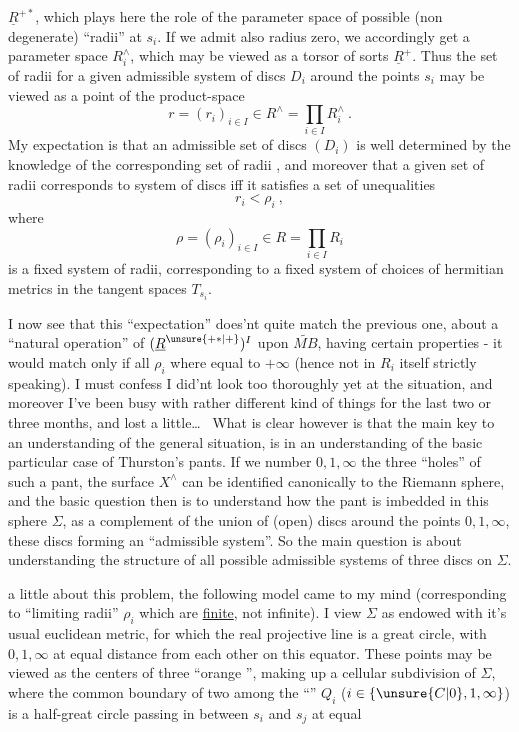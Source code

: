  $\underline R^{+*}$, which plays here the role of the parameter space of  possible (non degenerate) ``radii'' at $s_i$. If we admit also radius zero, we accordingly get a parameter space $R_i^{\wedge}$, which may be viewed as a torsor of sorts  $\underline R^+$. Thus the set of radii for a given admissible system of discs $D_i$ around the points $s_i$ may be viewed as a point of the product-space
\[
r=(r_i)_{i\in I}\in R^{\wedge}=\prod_{i\in I}R_i^{\wedge}\ .
\]
My expectation is that an admissible set of discs $(D_i)$ is well determined by the knowledge of the corresponding set of radii , and moreover that a given set of radii  corresponds to  system of  discs iff it satisfies a set of unequalities
\[
r_i<\rho_i\ ,
\]
where
\[
\rho=(\rho_i)_{i\in I}\in R=\prod_{i\in I}R_i
\]
is a  fixed system of radii, corresponding to a fixed system of choices of hermitian metrics in the tangent spaces $T_{s_i}$.

I now see that this ``expectation'' does'nt quite match the previous one, about a ``natural operation'' of $(\underline R^{\unsure{+*|+}})^I$ upon $\widetilde{MB}$, having certain properties - it would match only if all $\rho_i$ where equal to $+\infty$ (hence not in $R_i$ itself strictly speaking). I must confess I did'nt look too thoroughly yet at the situation, and moreover I've been busy with rather different kind of things for the last two or three months, and lost a little\ldots\  What is clear however is that the main key to an understanding of the general situation, is in an understanding of the basic particular case of Thurston's pants. If we number $0,1,\infty$ the three ``holes'' of such a pant, the surface $X^{\wedge}$ can be identified canonically to the Riemann sphere, and the basic question then is to understand how the pant is imbedded in this sphere $\Sigma$, as a complement of  the union of (open) discs around the points $0,1,\infty$, these discs forming an ``admissible system''. So the main question is about understanding the structure of all possible admissible systems of three discs on $\Sigma$.

 a little about this problem, the following model came to my mind (corresponding to ``limiting radii'' $\rho_i$ which are \uline{finite}, not infinite). I view $\Sigma$ as endowed with it's usual euclidean metric, for which the real projective line is a great circle, with $0,1,\infty$ at equal distance from each other on this equator. These points may be viewed as the centers of three ``orange '', making up a cellular subdivision of $\Sigma$, where the common boundary of two among the ``'' $Q_i$ ($i\in\{\unsure{C|0},1,\infty\}$) is a half-great circle passing in between $s_i$ and $s_j$ at equal

